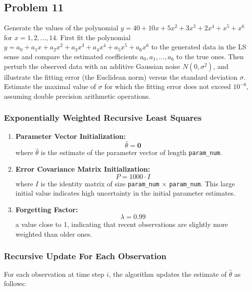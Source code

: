 \subsection{Problem 11}%
\label{sec:problem_11}
Generate the values of the polynomial $y = 40 + 10x + 5x^2 + 3x^3 + 2x^4 + x^5 + x^6$
for $x = 1, 2, \ldots, 14$.
First fit the polynomial $y = a_0 + a_1x + a_2x^2 + a_3x^3 + a_4x^4 + a_5x^5 + a_6x^6$
to the generated data in the LS sense and compare the estimated coefficients
$a_0, a_1, \ldots, a_6$ to the true ones.
Then perturb the observed data with an additive Gaussian noise $\textit{N}(0,\sigma^2)$,
and illustrate the fitting error (the Euclidean norm) versus the standard deviation
$\sigma$.
Estimate the maximal value of $\sigma$ for which the fitting error does not exceed
$10^{-6}$, assuming double precision arithmetic operations.


\subsubsection*{Exponentially Weighted Recursive Least Squares}
\begin{enumerate}
    \item \textbf{Parameter Vector Initialization:}
    \[ \hat{\theta} = \mathbf{0} \]
    where \( \hat{\theta} \) is the estimate of the parameter vector of length \texttt{param\_num}.
    
    \item \textbf{Error Covariance Matrix Initialization:}
    \[ P = 1000 \cdot I \]
    where \( I \) is the identity matrix of size \texttt{param\_num} $\times$ \texttt{param\_num}. This large initial value indicates high uncertainty in the initial parameter estimates.
    
    \item \textbf{Forgetting Factor:}
    \[ \lambda = 0.99 \]
    a value close to 1, indicating that recent observations are slightly more weighted than older ones.
\end{enumerate}

\subsubsection*{Recursive Update For Each Observation}

For each observation at time step \(i\), the algorithm updates the estimate of \( \hat{\theta} \) as follows:


